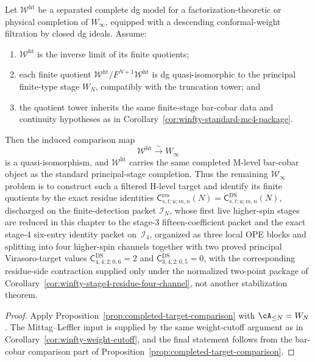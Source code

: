 \begin{corollary}
\label{cor:winfty-hlevel-comparison-criterion}
Let $\mathcal{W}^{\mathrm{ht}}$ be a separated complete dg model for a
factorization-theoretic or physical completion of $W_\infty$, equipped
with a descending conformal-weight filtration by closed dg ideals.
Assume:
\begin{enumerate}
\item $\mathcal{W}^{\mathrm{ht}}$ is the inverse limit of its finite quotients;
\item each finite quotient
 $\mathcal{W}^{\mathrm{ht}}/F^{N+1}\mathcal{W}^{\mathrm{ht}}$ is dg
 quasi-isomorphic to the principal finite-type stage $W_N$,
 compatibly with the truncation tower; and
\item the quotient tower inherits the same finite-stage bar-cobar data
 and continuity hypotheses as in
 Corollary~\ref{cor:winfty-standard-mc4-package}.
\end{enumerate}
Then the induced comparison map
\[
\mathcal{W}^{\mathrm{ht}} \xrightarrow{\sim} W_\infty
\]
is a quasi-isomorphism, and $\mathcal{W}^{\mathrm{ht}}$ carries the same
completed M-level bar-cobar object as the standard principal-stage
completion. Thus the remaining $\mathcal{W}_\infty$ problem is to
construct such a filtered H-level target and identify its finite
quotients by the exact residue identities
$\mathsf{C}^{\mathrm{res}}_{s,t;u;m,n}(N)
=\mathsf{C}^{\mathrm{DS}}_{s,t;u;m,n}(N)$,
discharged on the finite-detection packet $\mathcal{I}_N$, whose first
live higher-spin stages are reduced in this chapter to
the stage-$3$ fifteen-coefficient packet and the exact stage-$4$
six-entry identity packet on~$\mathcal{I}_4$, organized as three local
OPE blocks and splitting into four higher-spin channels together with
two proved principal Virasoro-target values
$\mathsf{C}^{\mathrm{DS}}_{4,4;2;0,6}=2$ and
$\mathsf{C}^{\mathrm{DS}}_{3,4;2;0,5}=0$, with the corresponding
residue-side contraction supplied only under the normalized two-point
package of Corollary~\ref{cor:winfty-stage4-residue-four-channel}, not
another stabilization theorem.
\end{corollary}

\begin{proof}
Apply Proposition~\ref{prop:completed-target-comparison} with
$\cA_{\le N}=W_N$. The Mittag--Leffler input is supplied by the same
weight-cutoff argument as in Corollary~\ref{cor:winfty-weight-cutoff},
and the final statement follows from the bar-cobar comparison part of
Proposition~\ref{prop:completed-target-comparison}.
\end{proof}

